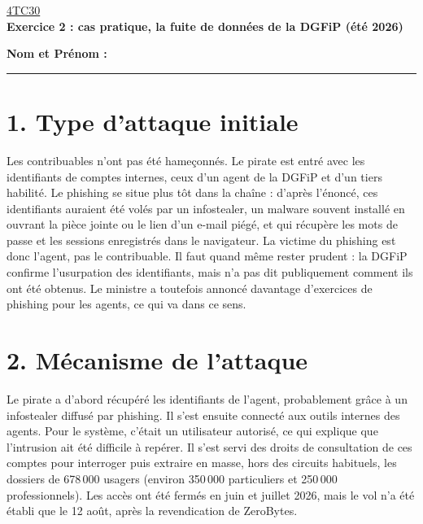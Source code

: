 \documentclass[10pt,a4paper]{article}
\begin{document}
\begin{center}
  \underline{4TC30}\\[2pt]
  {\large\bfseries Exercice 2 : cas pratique, la fuite de données de la DGFiP (été 2026)}
\end{center}
\textbf{Nom et Prénom :} \rule{8cm}{0.4pt}

\section{1. Type d'attaque initiale}
Les contribuables n'ont pas été hameçonnés. Le pirate est entré avec les identifiants de comptes internes, ceux d'un agent de la DGFiP et d'un tiers habilité. Le phishing se situe plus tôt dans la chaîne : d'après l'énoncé, ces identifiants auraient été volés par un infostealer, un malware souvent installé en ouvrant la pièce jointe ou le lien d'un e-mail piégé, et qui récupère les mots de passe et les sessions enregistrés dans le navigateur. La victime du phishing est donc l'agent, pas le contribuable. Il faut quand même rester prudent : la DGFiP confirme l'usurpation des identifiants, mais n'a pas dit publiquement comment ils ont été obtenus. Le ministre a toutefois annoncé davantage d'exercices de phishing pour les agents, ce qui va dans ce sens.

\section{2. Mécanisme de l'attaque}
Le pirate a d'abord récupéré les identifiants de l'agent, probablement grâce à un infostealer diffusé par phishing. Il s'est ensuite connecté aux outils internes des agents. Pour le système, c'était un utilisateur autorisé, ce qui explique que l'intrusion ait été difficile à repérer. Il s'est servi des droits de consultation de ces comptes pour interroger puis extraire en masse, hors des circuits habituels, les dossiers de 678\,000 usagers (environ 350\,000 particuliers et 250\,000 professionnels). Les accès ont été fermés en juin et juillet 2026, mais le vol n'a été établi que le 12 août, après la revendication de ZeroBytes.
\end{document}
